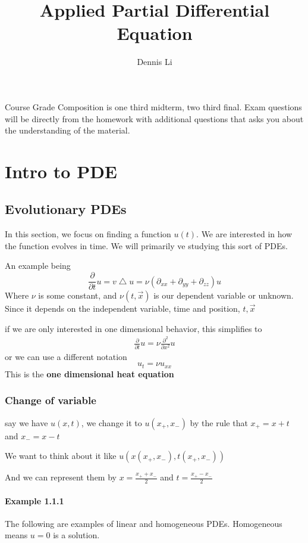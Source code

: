 \documentclass[12pt]{book}
\title{\textbf{Applied Partial Differential Equation}}
\author{Dennis Li}
\newcommand{\pypx}[2]{\frac{\partial #1}{\partial #2}}
\newcommand{\paren}[1]{\left( #1 \right)}
\begin{document}
\maketitle

\tableofcontents
Course Grade Composition is one third midterm, two third final.
Exam questions will be directly from the homework with additional questions that asks you about the understanding of the material.

\chapter{Intro to PDE}

\section{Evolutionary PDEs}
In this section, we focus on finding a function $u(t)$. We are interested in how the function evolves in time. We will primarily ve studying this sort of PDEs.

An example being 
\[
\pypx{}{t} u = v \bigtriangleup u = \nu(\partial_{xx} + \partial_{yy} + \partial_{zz})u
\]
Where $\nu$ is some constant, and $\nu(t,\Vec{x})$ is our dependent variable or unknown. Since it depends on the independent variable, time and position, $t, \Vec{x}$ 

if we are only interested in one dimensional behavior, this simplifies to
\begin{align*}
\pypx{}{t}u = \nu \pypx{^2}{x^2} u 
\end{align*}
or we can use a different notation
\[
u_t = \nu u_{xx}
\]
This is the \textbf{one dimensional heat equation}

\subsection{Change of variable}
say we have $u(x,t)$, we change it to $u(x_+,x_-)$ by the rule that $x_+ = x+t$ and $x_- = x-t$

We want to think about it like $u\paren{x(x_+,x_-),t(x_+,x_-)}$

And we can represent them by $x = \frac{x_++x_-}{2}$ and $t = \frac{x_+-x_-}{2}$

\subsubsection{Example 1.1.1}
The following are examples of linear and homogeneous PDEs. Homogeneous means $u=0$ is a solution.
\end{document}

